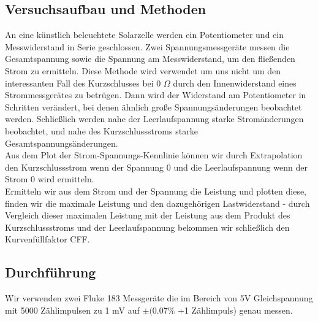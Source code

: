 \documentclass{article}
\begin{document}
\subsection{Versuchsaufbau und Methoden}
An eine künstlich beleuchtete Solarzelle werden ein Potentiometer und ein Messwiderstand in Serie geschlossen. Zwei Spannungsmessgeräte messen die Gesamtspannung sowie die Spannung am Messwiderstand, um den fließenden Strom zu ermitteln. Diese Methode wird verwendet um uns nicht um den interessanten Fall des Kurzschlusses bei 0 $\Omega$ durch den Innenwiderstand eines Strommessgerätes zu betrügen. Dann wird der Widerstand am Potentiometer in Schritten verändert, bei denen ähnlich große Spannungsänderungen beobachtet werden. Schließlich werden nahe der Leerlaufspannung starke Stromänderungen beobachtet, und nahe des Kurzschlussstroms starke Gesamtspannungsänderungen.\\
Aus dem Plot der Strom-Spannungs-Kennlinie können wir durch Extrapolation den Kurzschlussstrom wenn der Spannung 0 und die Leerlaufspannung wenn der Strom 0 wird ermitteln.\\
Ermitteln wir aus dem Strom und der Spannung die Leistung und plotten diese, finden wir die maximale Leistung und den dazugehörigen Lastwiderstand - durch Vergleich dieser maximalen Leistung mit der Leistung aus dem Produkt des Kurzschlussstroms und der Leerlaufspannung bekommen wir schließlich den Kurvenfüllfaktor CFF.
\subsection{Durchführung}
Wir verwenden zwei Fluke 183 Messgeräte die im Bereich von 5V Gleichspannung mit 5000 Zählimpulsen zu 1 mV auf $\pm (0.07\%$ +1 Zählimpuls) genau messen.
\end{document}
